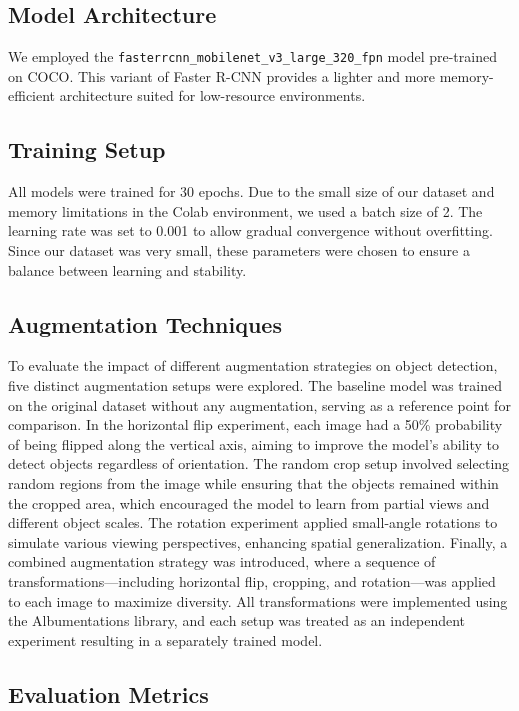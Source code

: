 \documentclass[12pt]{article}
\begin{document}
\subsection{Model Architecture}
We employed the \texttt{fasterrcnn\_mobilenet\_v3\_large\_320\_fpn} model pre-trained on COCO. This variant of Faster R-CNN provides a lighter and more memory-efficient architecture suited for low-resource environments.

\subsection{Training Setup}
All models were trained for 30 epochs. Due to the small size of our dataset and memory limitations in the Colab environment, we used a batch size of 2. The learning rate was set to 0.001 to allow gradual convergence without overfitting. Since our dataset was very small, these parameters were chosen to ensure a balance between learning and stability.

\subsection{Augmentation Techniques}

To evaluate the impact of different augmentation strategies on object detection, five distinct augmentation setups were explored. The baseline model was trained on the original dataset without any augmentation, serving as a reference point for comparison. In the horizontal flip experiment, each image had a 50\% probability of being flipped along the vertical axis, aiming to improve the model's ability to detect objects regardless of orientation. The random crop setup involved selecting random regions from the image while ensuring that the objects remained within the cropped area, which encouraged the model to learn from partial views and different object scales. The rotation experiment applied small-angle rotations to simulate various viewing perspectives, enhancing spatial generalization. Finally, a combined augmentation strategy was introduced, where a sequence of transformations—including horizontal flip, cropping, and rotation—was applied to each image to maximize diversity. All transformations were implemented using the Albumentations library, and each setup was treated as an independent experiment resulting in a separately trained model.

\subsection{Evaluation Metrics}
\end{document}
